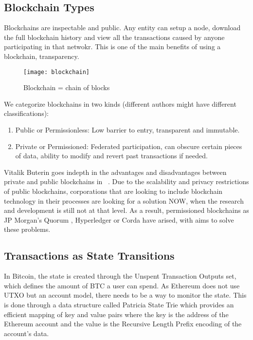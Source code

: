 \subsection{Blockchain Types}
Blockchains are inspectable and public. Any entity can setup a node, download the full blockchain history and view all the transactions caused by anyone participating in that netwokr. This is one of the main benefits of using a blockchain, transparency.

\begin{figure}[ht]
    \centering
    \texttt{[image: blockchain]}
    \caption{Blockchain = chain of blocks}
    \label{blockchain}
\end{figure}

We categorize blockchains in two kinds (different authors might have different classifications):
\begin{enumerate}
    \item Public or Permissionless: Low barrier to entry, transparent and immutable.
    \item Private or Permissioned: Federated participation, can obscure certain pieces of data, ability to modify and revert past transactions if needed.
\end{enumerate}

Vitalik Buterin goes indepth in the advantages and disadvantages between private and public blockchains in ~\cite{publicprivate}. Due to the scalability and privacy restrictions of public blockchains, corporations that are looking to include blockchain technology in their processes are looking for a solution NOW, when the research and development is still not at that level. As a result, permissioned blockchains as JP Morgan's Quorum \cite{quorum}, Hyperledger or Corda have arised, with aims to solve these problems.

\subsection{Transactions as State Transitions}
In Bitcoin, the state is created through the Unspent Transaction Outputs set, which defines the amount of BTC  a user can spend. As Ethereum does not use UTXO but an account model, there needs to be a way to monitor the state. This is done through a data structure called Patricia State Trie \cite{Morrison:1968:PAR:321479.321481} which provides an efficient mapping of key and value pairs where the key is the address of the Ethereum account and the value is the Recursive Length Prefix encoding \cite{rlp} of the account's data. %

